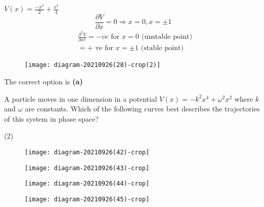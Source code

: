 \begin{enumerate}
\begin{tasks}
\begin{figure}[H]
	\end{figure}
\end{tasks}
\begin{answer}$\left. \right. $\\
	\begin{minipage}{0.5\textwidth}
	$V(x)=\frac{-x^{2}}{2}+\frac{x^{4}}{4}$
	$$
	\frac{\partial V}{\partial x}=0 \Rightarrow x=0, x=\pm 1
	$$
	$$
	\begin{aligned}
	&\frac{\partial^{2} V}{\partial x^{2}}=-v e \text { for } x=0 \text { (unstable point) } \\
	&=+\text { ve for } x=\pm 1 \text { (stable point) }
	\end{aligned}
	$$
	\end{minipage}
	\begin{minipage}{0.5\textwidth}
	\begin{figure}[H]
		\centering
		\texttt{[image: diagram-20210926(28)-crop(2)]}
		\caption{}
		\label{}
	\end{figure}
	\end{minipage}
The correct option is \textbf{(a)}
\end{answer}
\begin{minipage}{\textwidth}
	\item A particle moves in one dimension in a potential $V(x)=-k^{2} x^{4}+\omega^{2} x^{2}$ where $k$ and $\omega$ are constants. Which of the following curves best describes the trajectories of this system in phase space?
\end{minipage}
\begin{tasks}(2)
	\task[\textbf{A.}]\begin{figure}[H]
		\centering
		\texttt{[image: diagram-20210926(42)-crop]}
	\end{figure}
	\task[\textbf{B.}]\begin{figure}[H]
		\centering
		\texttt{[image: diagram-20210926(43)-crop]}
	\end{figure}
	\task[\textbf{C.}]\begin{figure}[H]
		\centering
		\texttt{[image: diagram-20210926(44)-crop]}
	\end{figure}
	\task[\textbf{D.}]\begin{figure}[H]
		\centering
		\texttt{[image: diagram-20210926(45)-crop]}
	\end{figure}
\end{tasks}
\begin{answer}$\left. \right. $\\

\end{answer}
\end{enumerate}
